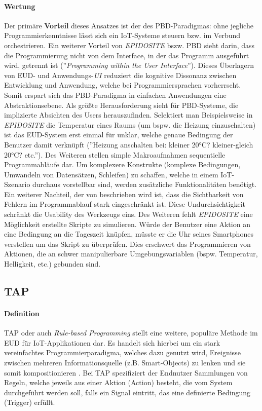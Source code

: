 \paragraph{Wertung} Der primäre \textbf{Vorteil} dieses Ansatzes ist der des \ac{PBD}-Paradigmas: ohne jegliche Programmierkenntnisse lässt sich ein \ac{IoT}-Systeme steuern bzw. im Verbund orchestrieren. Ein weiterer Vorteil von \textit{EPIDOSITE} bszw. \ac{PBD} sieht \cite{cypher1993pbd} darin, dass die Programmierung nicht von dem Interface, in der das Programm ausgeführt wird, getrennt ist (''\textit{Programming within the User Interface}''). Dieses Überlagern von \ac{EUD}- und Anwendungs-\textit{UI} reduziert die kognitive Dissonanz zwischen Entwicklung und Anwendung, welche bei Programmiersprachen vorherrscht. Somit erspart sich das \ac{PBD}-Paradigma in einfachen Anwendungen eine Abstraktionsebene. Als größte Herausforderung sieht \cite{cypher1993pbd} für \ac{PBD}-Systeme, die implizierte Absichten des Users herauszufinden. Selektiert man Beispielsweise in \textit{EPIDOSITE} die Temperatur eines Raums (um bspw. die Heizung einzuschalten) ist das \ac{EUD}-System erst einmal für unklar, welche genaue Bedingung der Benutzer damit verknüpft (''Heizung anschalten bei: kleiner 20°C? kleiner-gleich 20°C? etc.''). Des Weiteren stellen simple Makroaufnahmen sequentielle Programmabläufe dar. Um komplexere Konstrukte (komplexe Bedingungen, Umwandeln von Datensätzen, Schleifen) zu schaffen, welche in einem \ac{IoT}-Szenario durchaus vorstellbar sind, werden zusätzliche Funktionalitäten benötigt. Ein weiterer Nachteil, der von \cite{li2017programming} beschrieben wird ist, dass die Sichtbarkeit von Fehlern im Programmablauf stark eingeschränkt ist. Diese Undurchsichtigkeit schränkt die Usability des Werkzeugs eins. Des Weiteren fehlt \textit{EPIDOSITE} eine Möglichkeit erstellte Skripte zu simulieren. Würde der Benutzer eine Aktion an eine Bedingung an die Tageszeit knüpfen, müsste er die Uhr seines Smartphones verstellen um das Skript zu überprüfen. Dies erschwert das Programmieren von Aktionen, die an schwer manipulierbare Umgebungsvariablen (bspw. Temperatur, Helligkeit, etc.) gebunden sind.

\subsection{\acl{TAP}}

\paragraph{Definition} \ac{TAP} oder auch \textit{Rule-based Programming} stellt eine weitere, populäre Methode im \ac{EUD} für \ac{IoT}-Applikationen dar. Es handelt sich hierbei um ein stark vereinfachtes Programmierparadigma, welches dazu genutzt wird, Ereignisse zwischen mehreren Informationsquelle (z.B. Smart-Objects) zu lenken und sie somit kompositionieren \cite{ur2014practical}. Bei \ac{TAP} spezifiziert der Endnutzer Sammlungen von Regeln, welche jeweils aus einer Aktion (Action) besteht, die vom System durchgeführt werden soll, falls ein Signal eintritt, das eine definierte Bedingung (Trigger) erfüllt. 

